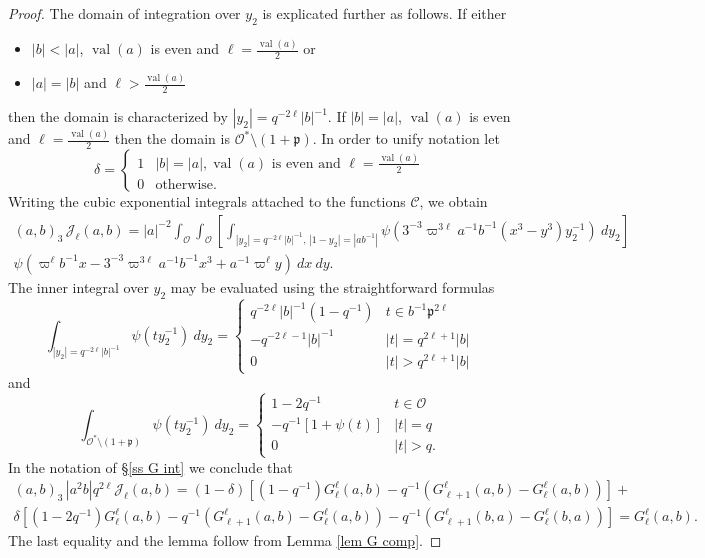 \documentclass[12pt]{amsart}
\newcommand{\abs}[1]{\left|{#1}\right|}
\newcommand{\p}{\mathfrak{p}}
\newcommand{\J}{\mathcal{J}}
\renewcommand{\O}{\mathcal{O}}
\newcommand{\val}{{\operatorname{val}}}
\newcommand{\Cu}{\mathcal{C}}
\theoremstyle{remark}
\begin{document}
\begin{proof}
The domain of integration over $y_2$ is explicated further as follows. 
If either 
\begin{itemize}
\item $\abs{b}<\abs{a}$, $\val(a)$ is even and $\ell=\frac{\val(a)}2$ or 
\item $\abs{a}=\abs{b}$ and $\ell>\frac{\val(a)}2$ 
\end{itemize}
then the domain is characterized by $\abs{y_2}=q^{-2\ell}\abs{b}^{-1}$. If $\abs{b}=\abs{a}$, $\val(a)$ is even and $\ell=\frac{\val(a)}2$ then the domain is $\O^*\setminus (1+\p)$. 
In order to unify notation let
\[
\delta=\begin{cases} 1 & \abs{b}=\abs{a}, \val(a)\text{ is even and }\ell=\frac{\val(a)}2 \\ 0 & \text{otherwise.} \end{cases}
\]
Writing the cubic exponential integrals attached to the functions $\Cu$, we obtain
\begin{multline*}
(a,b)_3\,\J_\ell(a,b)=\abs{a}^{-2}\int_\O \int_\O \left[\int_{\abs{y_2}=q^{-2\ell}\abs{b}^{-1},\,\abs{1-y_2}=\abs{ab^{-1}}} \psi(3^{-3}\varpi^{3\ell}a^{-1}b^{-1}(x^3-y^3)y_2^{-1})\ dy_2 \right]\\ \psi(\varpi^\ell b^{-1}x-3^{-3}\varpi^{3\ell} a^{-1}b^{-1}x^3+a^{-1}\varpi^\ell y)\ dx\ dy.
\end{multline*}
The inner integral over $y_2$ may be evaluated using the straightforward formulas
\begin{equation}\label{eq psiy}
\int_{\abs{y_2}=q^{-2\ell}\abs{b}^{-1}}\psi(ty_2^{-1})\ dy_2=\begin{cases} q^{-2\ell}\abs{b}^{-1}(1-q^{-1}) & t\in b^{-1}\p^{2\ell} \\ -q^{-2\ell-1}\abs{b}^{-1}& \abs{t}=q^{2\ell+1}\abs{b} \\ 0 & \abs{t}>q^{2\ell+1}\abs{b} \end{cases} 
\end{equation}
and
\[
\int_{\O^*\setminus (1+\p)}\psi(ty_2^{-1})\ dy_2=\begin{cases} 1-2q^{-1} & t\in \O \\ -q^{-1}[1+\psi(t)] & \abs{t}=q \\ 0 & \abs{t}>q. \end{cases}
\]
In the notation of \S\ref{ss G int} we conclude that
\begin{multline*}
(a,b)_3\,\abs{a^2b}q^{2\ell}\J_\ell(a,b)
=(1-\delta)\left[ (1-q^{-1}) G_\ell^\ell(a,b)-q^{-1}(G_{\ell+1}^\ell(a,b)-G_\ell^\ell(a,b))\right]+\\ \delta\left[(1-2q^{-1})G_\ell^\ell(a,b)-q^{-1}(G_{\ell+1}^\ell(a,b)-G_\ell^\ell(a,b))-q^{-1}(G_{\ell+1}^\ell(b,a)-G_\ell^\ell(b,a))\right]=G_\ell^\ell(a,b).
\end{multline*}
The last equality and the lemma follow from Lemma \ref{lem G comp}.
\end{proof}
\end{document}
